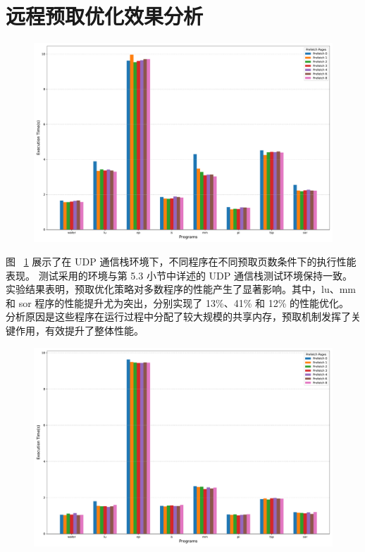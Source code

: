 {    \section{远程预取优化效果分析}
    \begin{figure}[!htbp]
        \centering
        \includegraphics[width=0.90\linewidth]{Img/udp_prefetch_execution_time.pdf}
        \label{fig:udp-prefetch-result}
    \end{figure}
    图 ~\ref{fig:udp-prefetch-result} 展示了在 UDP 通信栈环境下，不同程序在不同预取页数条件下的执行性能表现。
    测试采用的环境与第 5.3 小节中详述的 UDP 通信栈测试环境保持一致。
    实验结果表明，预取优化策略对多数程序的性能产生了显著影响。其中，lu、mm 和 sor 程序的性能提升尤为突出，分别实现了 13\%、41\% 和 12\% 的性能优化。
    分析原因是这些程序在运行过程中分配了较大规模的共享内存，预取机制发挥了关键作用，有效提升了整体性能。

    \begin{figure}
        \centering
        \includegraphics[width=0.90\linewidth]{Img/rdma_prefetch_execution_time.pdf}
        \label{fig:rdma-prefetch-result}
    \end{figure}

}
